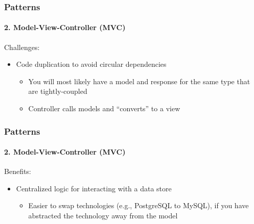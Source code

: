 \begin{frame}[fragile]
  \frametitle{Patterns}
  \framesubtitle{2. Model-View-Controller (MVC)}

  Challenges:
  \begin{itemize}
    \item Code duplication to avoid circular dependencies
    \begin{itemize}
      \item You will most likely have a model and response for the same type that are tightly-coupled
      \item Controller calls models and ``converts'' to a view
    \end{itemize}
  \end{itemize}
\end{frame}

\begin{frame}[fragile]
  \frametitle{Patterns}
  \framesubtitle{2. Model-View-Controller (MVC)}

  Benefits:
  \begin{itemize}
    \item Centralized logic for interacting with a data store
    \begin{itemize}
      \item Easier to swap technologies (e.g., PostgreSQL to MySQL), if you have abstracted the technology away from the model

    \end{itemize}
  \end{itemize}

\end{frame}

